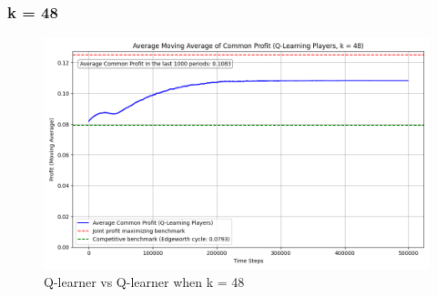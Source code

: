 \documentclass{article}
\begin{document}
\subsubsection{k = 48}
\begin{figure}[H]
    \centering
    \includegraphics[scale = 0.45]{K=48.png}
    \caption{Q-learner vs Q-learner when k = 48}
    \label{fig: QlearnervQlearnerK=48}
\end{figure}
\end{document}
